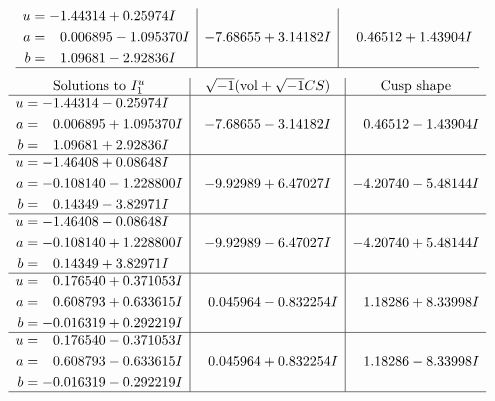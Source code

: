\documentclass[1p]{elsarticle_modified}
\theoremstyle{definition}
\newcommand{\I}{\sqrt{-1}}
\begin{document}
$$\begin{array}{c|c|c}
\begin{aligned}
u &= -1.44314 + 0.25974 I \\
a &= \phantom{-}0.006895 - 1.095370 I \\
b &= \phantom{-}1.09681 - 2.92836 I\end{aligned}
 & -7.68655 + 3.14182 I & \phantom{-}0.46512 + 1.43904 I\\
 \hline 
 \end{array}$$\newpage$$\begin{array}{c|c|c}  
\text{Solutions to }I^u_{1}& \I (\text{vol} + \sqrt{-1}CS) & \text{Cusp shape}\\
 \hline 
\begin{aligned}
u &= -1.44314 - 0.25974 I \\
a &= \phantom{-}0.006895 + 1.095370 I \\
b &= \phantom{-}1.09681 + 2.92836 I\end{aligned}
 & -7.68655 - 3.14182 I & \phantom{-}0.46512 - 1.43904 I \\ \hline\begin{aligned}
u &= -1.46408 + 0.08648 I \\
a &= -0.108140 - 1.228800 I \\
b &= \phantom{-}0.14349 - 3.82971 I\end{aligned}
 & -9.92989 + 6.47027 I & -4.20740 - 5.48144 I \\ \hline\begin{aligned}
u &= -1.46408 - 0.08648 I \\
a &= -0.108140 + 1.228800 I \\
b &= \phantom{-}0.14349 + 3.82971 I\end{aligned}
 & -9.92989 - 6.47027 I & -4.20740 + 5.48144 I \\ \hline\begin{aligned}
u &= \phantom{-}0.176540 + 0.371053 I \\
a &= \phantom{-}0.608793 + 0.633615 I \\
b &= -0.016319 + 0.292219 I\end{aligned}
 & \phantom{-}0.045964 - 0.832254 I & \phantom{-}1.18286 + 8.33998 I \\ \hline\begin{aligned}
u &= \phantom{-}0.176540 - 0.371053 I \\
a &= \phantom{-}0.608793 - 0.633615 I \\
b &= -0.016319 - 0.292219 I\end{aligned}
 & \phantom{-}0.045964 + 0.832254 I & \phantom{-}1.18286 - 8.33998 I\\
 \hline 
 \end{array}$$\newpage\newpage\renewcommand{\arraystretch}{1}
\end{document}
